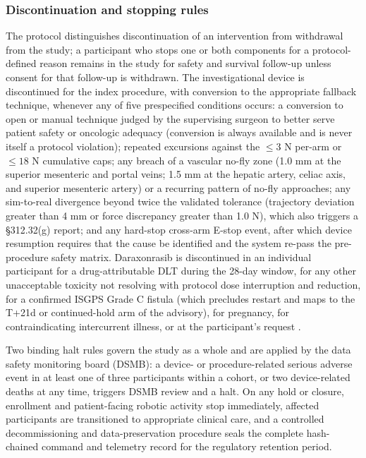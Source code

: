 \subsubsection*{Discontinuation and stopping rules}

The protocol distinguishes discontinuation of an intervention from withdrawal from
the study; a participant who stops one or both components for a protocol-defined
reason remains in the study for safety and survival follow-up unless consent for that
follow-up is withdrawn. The investigational device is discontinued for the index
procedure, with conversion to the appropriate fallback technique, whenever any of
five prespecified conditions occurs: a conversion to open or manual technique judged
by the supervising surgeon to better serve patient safety or oncologic adequacy
(conversion is always available and is never itself a protocol violation); repeated
excursions against the $\leq 3$ N per-arm or $\leq 18$ N cumulative caps; any breach
of a vascular no-fly zone (1.0 mm at the superior mesenteric and portal veins;
1.5 mm at the hepatic artery, celiac axis, and superior mesenteric artery) or a
recurring pattern of no-fly approaches; any sim-to-real divergence beyond twice the
validated tolerance (trajectory deviation greater than 4 mm or force discrepancy
greater than 1.0 N), which also triggers a \S 312.32(g) report; and any hard-stop
cross-arm E-stop event, after which device resumption requires that the cause be
identified and the system re-pass the pre-procedure safety matrix. Daraxonrasib is
discontinued in an individual participant for a drug-attributable DLT during the
28-day window, for any other unacceptable toxicity not resolving with protocol dose
interruption and reduction, for a confirmed ISGPS Grade C fistula (which precludes
restart and maps to the T+21d or continued-hold arm of the advisory), for pregnancy,
for contraindicating intercurrent illness, or at the participant's request
\cite{onpremwhippl,daraxwhipple}.

Two binding halt rules govern the study as a whole and are applied by the data
safety monitoring board (DSMB): a device- or procedure-related serious adverse event
in at least one of three participants within a cohort, or two device-related deaths
at any time, triggers DSMB review and a halt. On any hold or closure, enrollment and
patient-facing robotic activity stop immediately, affected participants are
transitioned to appropriate clinical care, and a controlled decommissioning and
data-preservation procedure seals the complete hash-chained command and telemetry
record for the regulatory retention period.

